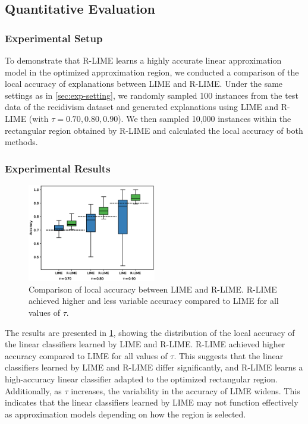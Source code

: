 \documentclass[runningheads]{llncs}
\begin{document}
\subsection{Quantitative Evaluation}
\subsubsection{Experimental Setup}
To demonstrate that R-LIME learns a highly accurate linear approximation model
in the optimized approximation region,
we conducted a comparison of the local accuracy of explanations
between LIME and R-LIME\@.
Under the same settings as in \cref{sec:exp-setting},
we randomly sampled 100 instances from the test data of the recidivism dataset
and generated explanations using LIME and R-LIME (with $\tau=0.70,0.80,0.90$).
We then sampled 10,000 instances within the rectangular region
obtained by R-LIME and calculated the local accuracy of both methods.
\subsubsection{Experimental Results}
\begin{figure}[tbp]
  \centering
  \includegraphics[width=0.5\textwidth]{box_plot}
  \caption[Comparison of Local Accuracy between R-LIME and LIME]{%
    Comparison of local accuracy between LIME and R-LIME\@.
    R-LIME achieved higher and less variable accuracy compared to LIME
    for all values of $\tau$.
  }\label{fig:box-plot}
\end{figure}
The results are presented in \cref{fig:box-plot},
showing the distribution of the local accuracy of the linear classifiers
learned by LIME and R-LIME\@.
R-LIME achieved higher accuracy compared to LIME for all values of $\tau$.
This suggests that the linear classifiers learned by LIME and R-LIME
differ significantly,
and R-LIME learns a high-accuracy linear classifier
adapted to the optimized rectangular region.
Additionally, as $\tau$ increases,
the variability in the accuracy of LIME widens.
This indicates that the linear classifiers learned by LIME may not function
effectively as approximation models depending on how the region is selected.
\end{document}
